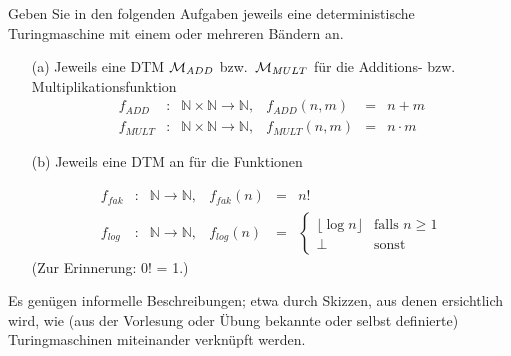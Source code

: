 
\begin{exercise}
Geben Sie in den folgenden Aufgaben	jeweils 
eine deterministische Turingmaschine 
mit einem oder mehreren Bändern an.
\begin{enumerate}
\item [(a)]
  Jeweils eine DTM $\mathcal{M}_{\mathit ADD}$ bzw.\  $\mathcal{M}_{\mathit MULT}$ f\"ur die
  Additions- bzw. Multiplikationsfunktion
$$ \begin{array}{lcllcl}
    f_{\mathit ADD} & : & \mathbb{N} \times \mathbb{N} \to \mathbb{N}, & 
    f_{\mathit ADD}(n,m) & = & n + m \\[1ex]
    f_{\mathit MULT} & : & \mathbb{N} \times \mathbb{N} \to \mathbb{N}, &
    f_{\mathit MULT}(n,m) & = & n \cdot m 
  \end{array}
  $$%
\item [(b)]
  Jeweils eine DTM an für die Funktionen

  $$ \begin{array}{lcllcl}
    f_{\mathit fak} & : & \mathbb{N} \to \mathbb{N}, & f_{\mathit fak}(n) & = & n! 
    \\[1ex]
    f_{\mathit \log} & : &  \mathbb{N} \to \mathbb{N}, &
    f_{\mathit \log}(n) & = & \begin{cases}
       \lfloor \log n  \rfloor & \text{falls $n \ge 1$} \\
        \bot & \text{sonst}
     \end{cases}
  \end{array}
  $$
(Zur Erinnerung: 0! = 1.)

\end{enumerate}

  Es gen\"ugen informelle Beschreibungen; etwa durch 
  Skizzen, aus denen ersichtlich wird, wie (aus der Vorlesung oder \"Ubung 
  bekannte oder selbst definierte) 
  Turingmaschinen miteinander verkn\"upft werden.

\end{exercise}

